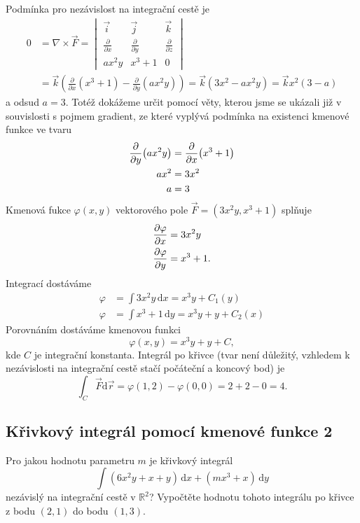 Podmínka pro nezávislost na integrační cestě je $$
\begin{aligned}
0&=\nabla \times  \vec F
=\begin{vmatrix}
  \vec i & \vec j& \vec k \\
  \frac{\partial}{\partial x} &  \frac{\partial}{\partial y} &  \frac{\partial}{\partial z}\\
  ax^2y &  x^3+1 &  0
\end{vmatrix}
\\&=\vec k \left(  \frac{\partial}{\partial x} (x^3+1) - \frac{\partial }{\partial y} (ax^2y)\right)
  =\vec k(3x^2-ax^2y)=\vec k x^2(3-a)
\end{aligned}
  $$
  a odsud $a=3$. Totéž dokážeme určit pomocí věty, kterou jsme se ukázali již v souvislosti s pojmem gradient, ze které vyplývá podmínka na existenci kmenové funkce ve tvaru $$
\begin{aligned}
  \pdv{y}(ax^2y)&=\pdv{x}(x^3+1)\\
  ax^2&=3x^2\\
  a&=3
\end{aligned}
$$
Kmenová fukce $\varphi(x,y)$ vektorového pole $\vec F=(3x^2y,x^3+1)$ splňuje
$$
\begin{aligned}
  \pdv{\varphi}{x}&=3x^2y \\  \pdv{\varphi}{y}&=x^3+1.
\end{aligned}
$$
Integrací dostáváme
$$
\begin{aligned}
  \varphi &= \int 3x^2y\,\mathrm dx=x^3y+C_1(y)\\
  \varphi &= \int x^3+1\,\mathrm dy=x^3y+y+C_2(x)
\end{aligned}
$$
Porovnáním dostáváme kmenovou funkci $$\varphi (x,y)=x^3y+y+C,$$ kde $C$ je integrační konstanta. Integrál po křivce (tvar není důležitý, vzhledem k nezávislosti na integrační cestě stačí počáteční a koncový bod) je
$$\int _C \vec F\mathrm d\vec r=\varphi(1,2)-\varphi(0,0)=2+2-0=4.$$


\konec

\subsection{Křivkový integrál pomocí kmenové funkce 2}

Pro jakou hodnotu parametru $m$ je křivkový integrál
$$\int (6x^2y+x+y)\,\mathrm dx+(mx^3+x)\,\mathrm dy$$ nezávislý na
integrační cestě v $\mathbb R^2$? Vypočtěte hodnotu tohoto integrálu
po křivce z bodu $(2,1)$ do bodu $(1,3)$.

